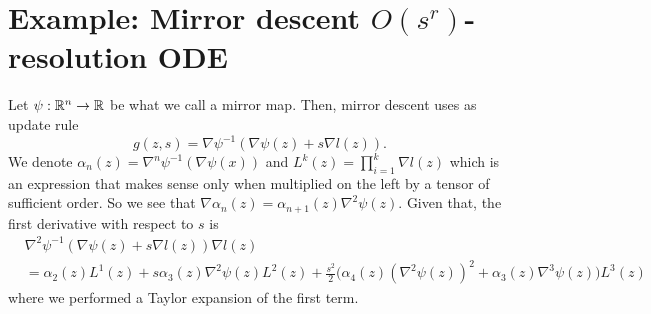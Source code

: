 \documentclass[main.tex]{subfiles}
\begin{document}
\section{Example: Mirror descent $O(s^r)$-resolution ODE}

Let $\psi: \mathbb{R}^n \to \mathbb{R}$ be what we call a mirror map. Then, mirror descent uses
as update rule \[ g(z, s) = \nabla\psi^{-1}(\nabla\psi(z) + s \nabla l(z)). \]
We denote $\alpha_n(z) = \nabla^n \psi^{-1}(\nabla \psi (x))$ and $L^k(z) =
	\prod_{i=1}^k \nabla l(z)$ which is an expression that makes sense only when
multiplied on the left by a tensor of sufficient order.
So we see that $\nabla \alpha_n(z) = \alpha_{n+1}(z) \nabla^2 \psi(z)$.
Given that, the first derivative with respect to $s$ is
\begin{align*}
	 & \nabla^2\psi^{-1}(\nabla \psi(z) + s \nabla l(z)) \nabla l(z) \\
	 & = \alpha_2(z)L^1(z) + s \alpha_3(z)\nabla^2 \psi(z) L^2(z) +
	\frac{s^2}{2} \big(\alpha_4(z) (\nabla^2 \psi(z))^2 + \alpha_3(z) \nabla^3
	\psi(z) \big)
	L^3(z)
\end{align*}
where we performed a Taylor expansion of the first term.
\end{document}

